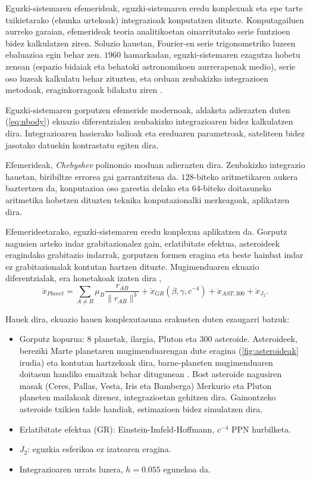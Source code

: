 Eguzki-sistemaren  efemerideak, eguzki-sistemaren eredu konplexuak eta epe tarte txikietarako (ehunka urtekoak) integrazioak konputatzen dituzte. Konputagailuen aurreko garaian, efemerideak teoria analitikoetan oinarritutako serie funtzioen bidez kalkulatzen ziren. Soluzio hauetan, Fourier-en serie trigonometriko luzeen ebaluazioa egin behar zen. $1960$ hamarkadan, eguzki-sistemaren ezagutza hobetu zenean (espazio bidaiak eta behatoki astronomikoen aurrerapenak medio), serie oso luzeak kalkulatu behar zituzten, eta orduan zenbakizko integrazioen metodoak, eraginkorragoak bilakatu ziren \cite{Kaplan2015}.   
   
Eguzki-sistemaren gorputzen efemeride modernoak, aldaketa adierazten duten (\ref{eq:nbody})  ekuazio diferentzialen  zenbakizko integrazioaren bidez kalkulatzen dira. Integrazioaren hasierako balioak eta ereduaren parametroak, sateliteen bidez jasotako datuekin kontrastatu egiten dira.

Efemerideak, \emph{Chebyshev} polinomio moduan adierazten dira. Zenbakizko integrazio hauetan, biribiltze errorea gai garrantzitsua da. $128$-biteko aritmetikaren aukera baztertzen da, konputazioa oso garestia delako eta $64$-biteko doitasuneko aritmetika hobetzen dituzten teknika konputazionalki merkeagoak, aplikatzen dira. 

Efemerideetarako, eguzki-sistemaren eredu konplexua aplikatzen da. Gorputz nagusien arteko indar grabitazionalez gain, erlatibitate efektua, asteroideek eragindako grabitazio indarrak, gorputzen formen eragina eta beste hainbat indar ez grabitazionalak kontutan hartzen dituzte. Mugimenduaren ekuazio diferentzialak, era honetakoak izaten dira \cite{Feinga2015},      
      \begin{equation*}
      \ddot{x}_{Planet}= \sum_{A \neq B} \mu_B \frac{r_{AB}}{\|r_{AB}\|^3}+\ddot{x}_{GR} (\beta,\gamma,c^{-4})+ \ddot{x}_{AST,300}+ \ddot{x}_{J_2}.
      \end{equation*}

Hauek dira, ekuazio hauen konplexutasuna erakusten duten ezaugarri batzuk:      
      \begin{itemize}
      \item Gorputz kopurua: $8$ planetak, ilargia, Pluton eta 300 asteroide. Asteroideek, bereziki Marte planetaren mugimenduarengan dute eragina (\ref{fig:asteroideak} irudia) eta kontutan hartzekoak dira, barne-planeten mugimenduaren doitasun handiko emaitzak behar ditugunean . Bost asteroide nagusiren masak (Ceres, Pallas, Vesta, Iris eta Bamberga) Merkurio eta Pluton planeten mailakoak direnez, integrazioetan gehitzen dira. Gainontzeko asteroide txikien talde handiak, estimazioen bidez simulatzen dira.
      \item Erlatibitate efektua (GR): Einstein-Imfeld-Hoffmann, $c^{-4}$ PPN hurbilketa.
      \item $J_2$: eguzkia esferikoa ez izatearen eragina. 
      \item Integrazioaren urrats luzera, $h=0.055$ egunekoa da.
      \end{itemize}   



